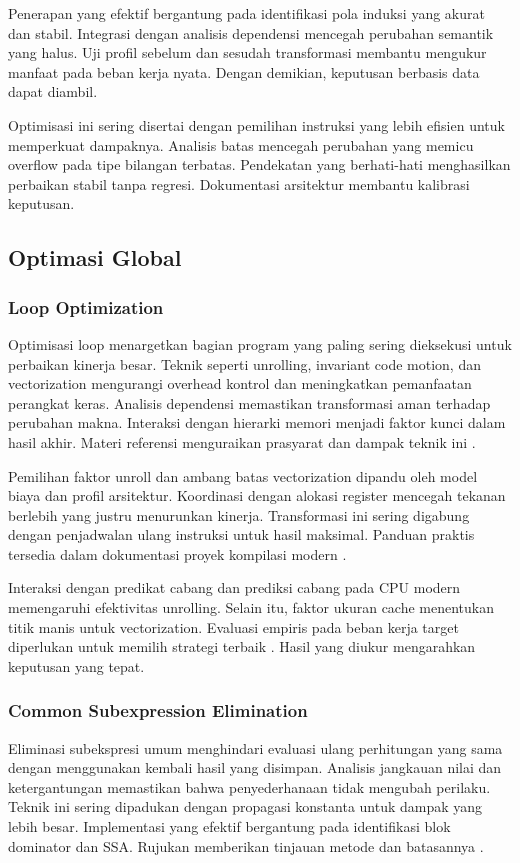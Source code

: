 \documentclass[../main.tex]{subfiles}
\begin{document}
Penerapan yang efektif bergantung pada identifikasi pola induksi yang akurat dan stabil. Integrasi dengan analisis dependensi mencegah perubahan semantik yang halus. Uji profil sebelum dan sesudah transformasi membantu mengukur manfaat pada beban kerja nyata. Dengan demikian, keputusan berbasis data dapat diambil.

Optimisasi ini sering disertai dengan pemilihan instruksi yang lebih efisien untuk memperkuat dampaknya. Analisis batas mencegah perubahan yang memicu overflow pada tipe bilangan terbatas. Pendekatan yang berhati-hati menghasilkan perbaikan stabil tanpa regresi. Dokumentasi arsitektur membantu kalibrasi keputusan.

\subsection{Optimasi Global}
\subsubsection{Loop Optimization}
Optimisasi loop menargetkan bagian program yang paling sering dieksekusi untuk perbaikan kinerja besar. Teknik seperti unrolling, invariant code motion, dan vectorization mengurangi overhead kontrol dan meningkatkan pemanfaatan perangkat keras. Analisis dependensi memastikan transformasi aman terhadap perubahan makna. Interaksi dengan hierarki memori menjadi faktor kunci dalam hasil akhir. Materi referensi menguraikan prasyarat dan dampak teknik ini \citep{WikiLoopOptimization}.

Pemilihan faktor unroll dan ambang batas vectorization dipandu oleh model biaya dan profil arsitektur. Koordinasi dengan alokasi register mencegah tekanan berlebih yang justru menurunkan kinerja. Transformasi ini sering digabung dengan penjadwalan ulang instruksi untuk hasil maksimal. Panduan praktis tersedia dalam dokumentasi proyek kompilasi modern \citep{LLVMOverview}.

Interaksi dengan predikat cabang dan prediksi cabang pada CPU modern memengaruhi efektivitas unrolling. Selain itu, faktor ukuran cache menentukan titik manis untuk vectorization. Evaluasi empiris pada beban kerja target diperlukan untuk memilih strategi terbaik \citep{WikiLoopOptimization}. Hasil yang diukur mengarahkan keputusan yang tepat.

\subsubsection{Common Subexpression Elimination}
Eliminasi subekspresi umum menghindari evaluasi ulang perhitungan yang sama dengan menggunakan kembali hasil yang disimpan. Analisis jangkauan nilai dan ketergantungan memastikan bahwa penyederhanaan tidak mengubah perilaku. Teknik ini sering dipadukan dengan propagasi konstanta untuk dampak yang lebih besar. Implementasi yang efektif bergantung pada identifikasi blok dominator dan SSA. Rujukan memberikan tinjauan metode dan batasannya \citep{WikiCSE}.
\end{document}
